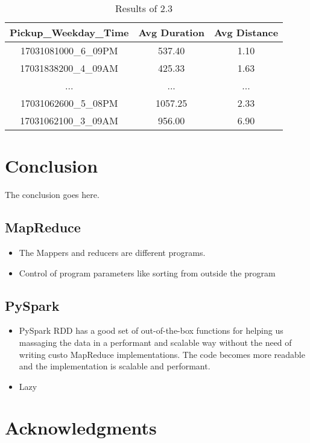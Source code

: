 \documentclass[conference,compsoc]{IEEEtran}
\begin{document}
\begin{table}[!t]
\renewcommand{\arraystretch}{1.3}
\caption{Results of 2.3}
\label{output_2_3}
\centering
\begin{tabular}{c||c|c}
\hline
\bfseries Pickup\_Weekday\_Time & \bfseries Avg Duration & \bfseries Avg Distance\\
\hline\hline
17031081000\_6\_09PM & 537.40 & 1.10\\
17031838200\_4\_09AM & 425.33 & 1.63\\
... & ... & ...\\
17031062600\_5\_08PM & 1057.25 & 2.33\\
17031062100\_3\_09AM & 956.00 & 6.90\\
\hline
\end{tabular}
\end{table}
\section{Conclusion}
The conclusion goes here.
\subsection{MapReduce}
\begin{itemize}
\item The Mappers and reducers are different programs.
\item Control of program parameters like sorting from outside the program
\end{itemize}
\subsection{PySpark}
\begin{itemize}
\item PySpark RDD has a good set of out-of-the-box functions for helping us massaging the data in a performant and scalable way without the need of writing custo MapReduce implementations. The code becomes more readable and the implementation is scalable and performant.
\item Lazy
\end{itemize}








\ifCLASSOPTIONcompsoc
  \section*{Acknowledgments}
\else
\end{document}
